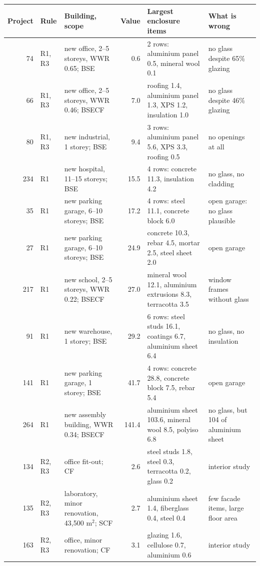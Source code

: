 \documentclass[10pt,letterpaper]{article}
\begin{document}
\begin{table}[p]
\centering\scriptsize
\setlength{\tabcolsep}{3pt}
\begin{tabular}{rlp{}rp{}p{}}
\toprule
Project & Rule & Building, scope & Value & Largest enclosure items & What is wrong \\
\midrule
74 & R1, R3 & new office, 2--5 storeys, WWR 0.65; BSE & 0.6 & 2 rows: aluminium panel 0.5, mineral wool 0.1 & no glass despite 65\% glazing \\
66 & R1, R3 & new office, 2--5 storeys, WWR 0.46; BSECF & 7.0 & roofing 1.4, aluminium panel 1.3, XPS 1.2, insulation 1.0 & no glass despite 46\% glazing \\
80 & R1, R3 & new industrial, 1 storey; BSE & 9.4 & 3 rows: aluminium panel 5.6, XPS 3.3, roofing 0.5 & no openings at all \\
234 & R1 & new hospital, 11--15 storeys; BSE & 15.5 & 4 rows: concrete 11.3, insulation 4.2 & no glass, no cladding \\
35 & R1 & new parking garage, 6--10 storeys; BSE & 17.2 & 4 rows: steel 11.1, concrete block 6.0 & open garage: no glass plausible \\
27 & R1 & new parking garage, 6--10 storeys; BSE & 24.9 & concrete 10.3, rebar 4.5, mortar 2.5, steel sheet 2.0 & open garage \\
217 & R1 & new school, 2--5 storeys, WWR 0.22; BSECF & 27.0 & mineral wool 12.1, aluminium extrusions 8.3, terracotta 3.5 & window frames without glass \\
91 & R1 & new warehouse, 1 storey; BSE & 29.2 & 6 rows: steel studs 16.1, coatings 6.7, aluminium sheet 6.4 & no glass, no insulation \\
141 & R1 & new parking garage, 1 storey; BSE & 41.7 & 4 rows: concrete 28.8, concrete block 7.5, rebar 5.4 & open garage \\
264 & R1 & new assembly building, WWR 0.34; BSECF & 141.4 & aluminium sheet 103.6, mineral wool 8.5, polyiso 6.8 & no glass, but 104 of aluminium sheet \\
\midrule
134 & R2, R3 & office fit-out; CF & 2.6 & steel studs 1.8, steel 0.3, terracotta 0.2, glass 0.2 & interior study \\
135 & R2, R3 & laboratory, minor renovation, 43{,}500 m$^2$; SCF & 2.7 & aluminium sheet 1.4, fiberglass 0.4, steel 0.4 & few facade items, large floor area \\
163 & R2, R3 & office, minor renovation; CF & 3.1 & glazing 1.6, cellulose 0.7, aluminium 0.6 & interior study \\

\end{tabular}
\end{table}
\end{document}
